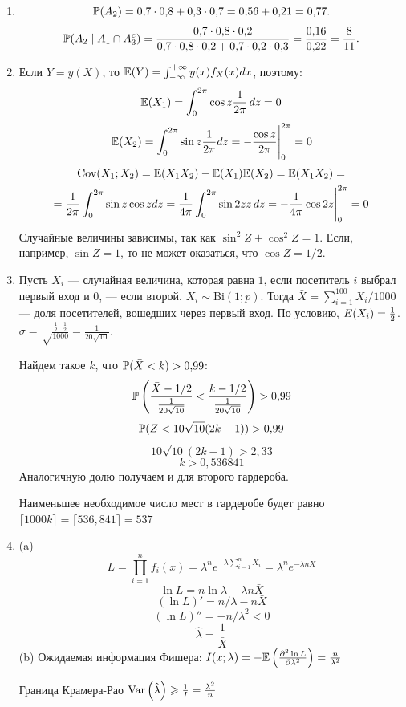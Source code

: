 \documentclass[12pt, a4paper]{article}\usepackage[]{graphicx}\usepackage[]{color}
\begin{document}
\begin{enumerate}
\item
\[
  \P(A_2)=0{,}7\cdot0{,}8+0{,}3\cdot0{,}7=0{,}56+0{,}21=0{,}77.
\]
\[
  \P(A_2 \mid A_1 \cap A_3^c)=
  \frac{0{,}7\cdot0{,}8\cdot0{,}2}{0{,}7\cdot0{,}8\cdot0{,}2+0{,}7\cdot0{,}2\cdot0{,}3}=\frac{0{,}16}{0{,}22}=
  \frac{8}{11}.
\]

\item
Если $Y=y(X)$, то $\E(Y)=\int_{-\infty}^{+\infty}y(x)f_X(x)dx$, поэтому:
\[\E(X_1)=\int_0^{2\pi}\cos z\frac{1}{2\pi} \, dz=0\]
\[\E(X_2)=\int_0^{2\pi}\sin z\frac{1}{2\pi} dz=-\frac{\cos z}{2\pi}\Bigg|^{2\pi}_0=0\]
\begin{multline*}
\Cov(X_1;X_2)=\E(X_1X_2)-\E(X_1)\E(X_2)=\E(X_1X_2)=\\
=\frac{1}{2\pi}\int_0^{2\pi}\sin z \cos zdz=
\frac{1}{4\pi}\int_0^{2\pi}\sin 2z z \,dz = -\frac{1}{4\pi}\cos2z\Bigg|^{2\pi}_0=0
\end{multline*}
Случайные величины зависимы, так как $\sin^2 Z+\cos^2 Z=1$. Если, например, $\sin Z=1$, то не может оказаться, что $\cos Z=1/2$.

\item Пусть $X_i$ — случайная величина, которая равна $1$, если посетитель $i$ выбрал первый вход и $0$, — если второй. $X_i\sim \mathrm{Bi}(1;p)$. Тогда $\bar X=\sum_{i=1}^{100} X_i/1000$ — доля посетителей, вошедших через первый вход. По условию, $\\E(X_i)=\frac{1}{2}$. $\sigma=\sqrt\frac{\frac12\cdot\frac12}{1000}=\frac{1}{20\sqrt{10}}$.

Найдем такое $k$, что $\P(\bar X<k)>0{,}99$:
\[\P\left(\frac{\bar X-1/2}{\frac{1}{20\sqrt{10}}}<\frac{k-1/2}{\frac{1}{20\sqrt{10}}}\right)>0{,}99\]
\[\P(Z<10\sqrt{10}(2k-1))>0{,}99\]
\[10\sqrt{10}(2k-1)>2{,}33\]
\[k>0{,}536841\]
Аналогичную долю получаем и для второго гардероба.

Наименьшее необходимое число мест в гардеробе будет равно $\lceil1000k\rceil=\lceil536{,}841\rceil=537$

\item
(a)
\[L=\prod_{i=1}^nf_i(x)=\lambda^n e^{-\lambda\sum_{i=1}^nX_i}=\lambda^n e^{-\lambda n\bar X}\]
\[\ln L=n\ln\lambda-\lambda n\bar X\]
\[(\ln L)'=n/\lambda-n\bar X\]
\[(\ln L)''=-n/\lambda^2<0\]
\[\hat\lambda=\frac{1}{\bar X}\]
(b) Ожидаемая информация Фишера:
$ I(x;\lambda)=-\E\left(\frac{\partial^2\ln L}{\partial\lambda^2}\right)=\frac{n}{\lambda^2}$


Граница Крамера-Рао $\Var\left(\hat\lambda\right)\ge\frac{1}{I}=\frac{\lambda^2}{n}$



\end{enumerate}
\end{document}
